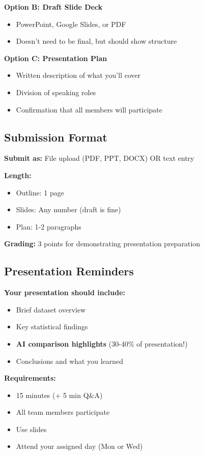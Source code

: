 \documentclass[10pt]{article}
\begin{document}
\textbf{Option B: Draft Slide Deck}
\begin{itemize}[leftmargin=20pt]
\item PowerPoint, Google Slides, or PDF
\item Doesn't need to be final, but should show structure
\end{itemize}

\textbf{Option C: Presentation Plan}
\begin{itemize}[leftmargin=20pt]
\item Written description of what you'll cover
\item Division of speaking roles
\item Confirmation that all members will participate
\end{itemize}

\subsection*{Submission Format}

\textbf{Submit as:} File upload (PDF, PPT, DOCX) OR text entry

\textbf{Length:}
\begin{itemize}[leftmargin=20pt]
\item Outline: 1 page
\item Slides: Any number (draft is fine)
\item Plan: 1-2 paragraphs
\end{itemize}

\textbf{Grading:} 3 points for demonstrating presentation preparation

\subsection*{Presentation Reminders}

\textbf{Your presentation should include:}
\begin{itemize}[leftmargin=20pt]
\item Brief dataset overview
\item Key statistical findings
\item \textbf{AI comparison highlights} (30-40\% of presentation!)
\item Conclusions and what you learned
\end{itemize}

\textbf{Requirements:}
\begin{itemize}[leftmargin=20pt]
\item 15 minutes (+ 5 min Q\&A)
\item All team members participate
\item Use slides
\item Attend your assigned day (Mon or Wed)
\end{itemize}
\end{document}
